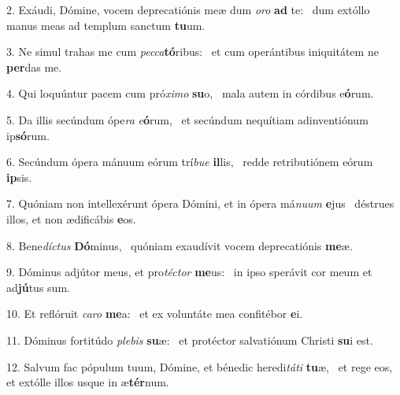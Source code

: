 2. Exáudi, Dómine, vocem deprecatiónis meæ dum \textit{o}\textit{ro} \textbf{ad} te: \ast\  dum extóllo manus meas ad templum sanctum \textbf{tu}um.\

3. Ne simul trahas me cum \textit{pec}\textit{ca}\textbf{tó}ribus: \ast\  et cum operántibus iniquitátem ne \textbf{per}das me.\

4. Qui loquúntur pacem cum pró\textit{xi}\textit{mo} \textbf{su}o, \ast\  mala autem in córdibus e\textbf{ó}rum.\

5. Da illis secúndum ópe\textit{ra} \textit{e}\textbf{ó}rum, \ast\  et secúndum nequítiam adinventiónum ip\textbf{só}rum.\

6. Secúndum ópera mánuum eórum trí\textit{bu}\textit{e} \textbf{il}lis, \ast\  redde retributiónem eórum \textbf{ip}sis.\

7. Quóniam non intellexérunt ópera Dómini, et in ópera má\textit{nu}\textit{um} \textbf{e}jus \ast\  déstrues illos, et non ædificábis \textbf{e}os.\

8. Bene\textit{díc}\textit{tus} \textbf{Dó}minus, \ast\  quóniam exaudívit vocem deprecatiónis \textbf{me}æ.\

9. Dóminus adjútor meus, et pro\textit{téc}\textit{tor} \textbf{me}us: \ast\  in ipso sperávit cor meum et ad\textbf{jú}tus sum.\

10. Et reflóruit \textit{ca}\textit{ro} \textbf{me}a: \ast\  et ex voluntáte mea confitébor \textbf{e}i.\

11. Dóminus fortitúdo \textit{ple}\textit{bis} \textbf{su}æ: \ast\  et protéctor salvatiónum Christi \textbf{su}i est.\

12. Salvum fac pópulum tuum, Dómine, et bénedic heredi\textit{tá}\textit{ti} \textbf{tu}æ, \ast\  et rege eos, et extólle illos usque in æ\textbf{tér}num.\

